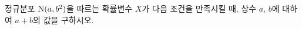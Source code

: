 정규분포 $\mathrm{N}(a{,}\mkern3mu\mathopen{}b^2)$을 따르는 확률변수 $X$가 다음 조건을 만족시킬 때, 상수 $a$, $b$에 대하여 $a+b$의 값을 구하시오.  

